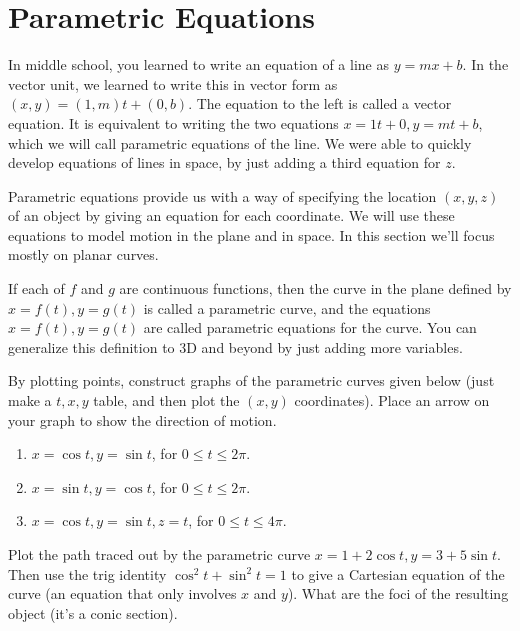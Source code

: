 
\section{Parametric Equations}
In middle school, you learned to write an equation of a line as $y=mx+b$.  In the vector unit, we learned to write this in vector form as $(x,y)=(1,m)t+(0,b)$. The equation to the left is called a vector equation.  It is equivalent to writing the two equations $x=1t+0,y=mt+b$, which we will call parametric equations of the line. We were able to quickly develop equations of lines in space, by just adding a third equation for $z$.

Parametric equations provide us with a way of specifying the location $(x,y,z)$ of an object by giving an equation for each coordinate.  We will use these equations to model motion in the plane and in space.  In this section we'll focus mostly on planar curves.

\begin{definition}
If each of $f$ and $g$ are continuous functions, then the curve in the plane defined by $x=f(t),y=g(t)$ is called a parametric curve, and the equations $x=f(t),y=g(t)$ are called parametric equations for the curve. You can generalize this definition to 3D and beyond by just adding more variables.
\end{definition}

\begin{problem} 
By plotting points, construct graphs of the parametric curves given below (just make a $t,x,y$ table, and then plot the $(x,y)$ coordinates).  Place an arrow on your graph to show the direction of motion.
\begin{enumerate}
\item $x=\cos t, y=\sin t$, for $0\leq t\leq 2\pi$.
\item $x=\sin t, y=\cos t$, for $0\leq t\leq 2\pi$.
\item $x=\cos t, y=\sin t, z=t$, for $0\leq t\leq 4\pi$.
\end{enumerate} 
\end{problem}

\begin{problem}
Plot the path traced out by the parametric curve $x=1+2\cos t, y=3+5\sin t$.  Then use the trig identity $\cos^2t+\sin^2t=1$ to give a Cartesian equation of the curve (an equation that only involves $x$ and $y$). What are the foci of the resulting object (it's a conic section).
\end{problem}

